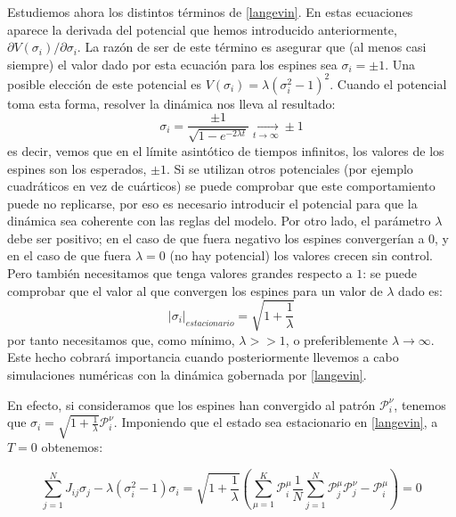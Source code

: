 \documentclass[titlepage,12pt]{article}
\numberwithin{equation}{section}
\begin{document}
	Estudiemos ahora los distintos términos de \eqref{langevin}. En estas ecuaciones aparece la derivada del potencial que hemos introducido anteriormente, ${\partial V(\sigma_i)}/{\partial \sigma_i}$. La razón de ser de este término es asegurar que (al menos casi siempre) el valor dado por esta ecuación para los espines sea $\sigma_i=\pm 1$. Una posible elección de este potencial es $V(\sigma_i)=\lambda\left(\sigma_i^2-1\right)^2$. Cuando el potencial toma esta forma, resolver la dinámica nos lleva al resultado:
	\begin{displaymath}
	\sigma_i = \frac{\pm 1}{\sqrt{1-e^{-2\lambda t}}} \xrightarrow[t \rightarrow \infty]{}\pm 1
	\end{displaymath}
	es decir, vemos que en el límite asintótico de tiempos infinitos, los valores de los espines son los esperados, $\pm 1$. Si se utilizan otros potenciales (por ejemplo cuadráticos en vez de cuárticos) se puede comprobar que este comportamiento puede no replicarse, por eso es necesario introducir el potencial para que la dinámica sea coherente con las reglas del modelo. Por otro lado, el parámetro $\lambda$ debe ser positivo; en el caso de que fuera negativo los espines convergerían a $0$, y en el caso de que fuera $\lambda = 0$ (no hay potencial) los valores crecen sin control. Pero también necesitamos que tenga valores grandes respecto a $1$: se puede comprobar que el valor al que convergen los espines para un valor de $\lambda$ dado es:
	\begin{displaymath}
	|\sigma_i|_{estacionario}=\sqrt{1 + \frac{1}{\lambda}}
	\end{displaymath}
	por tanto necesitamos que, como mínimo, $\lambda >> 1$, o preferiblemente $\lambda\rightarrow\infty$. Este hecho cobrará importancia cuando posteriormente llevemos a cabo simulaciones numéricas con la dinámica gobernada por \eqref{langevin}.

    En efecto, si consideramos que los espines han convergido al patrón $\mathcal{P}^\nu_i$, tenemos que $\sigma_i = \sqrt{1 + \frac{1}{\lambda}} \mathcal{P}^\nu_i$. Imponiendo que el estado sea estacionario en \eqref{langevin}, a $T = 0$ obtenemos:

	\begin{equation*}
	\sum_{j=1}^N J_{ij}\sigma_j - \lambda(\sigma_i^2-1)\sigma_i = \sqrt{1 + \frac{1}{\lambda}} \left( \sum_{\mu=1}^K \mathcal{P}^\mu_i \frac{1}{N} \sum_{j=1}^N \mathcal{P}^\mu_j \mathcal{P}^\nu_j  - \mathcal{P}^\mu_i \right) = 0
	\end{equation*} 
	
\end{document}
